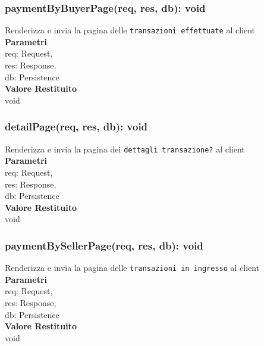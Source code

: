\documentclass[a4paper, 12pt]{article}
\begin{document}
\subsubsection{paymentByBuyerPage(req, res, db): void}
Renderizza e invia la pagina delle \texttt{transazioni effettuate} al client\\
\textbf{Parametri}\\
req: Request,\\
res: Response,\\
db: Persistence\\
\textbf{Valore Restituito}\\
void
\subsubsection{detailPage(req, res, db): void}
Renderizza e invia la pagina dei \texttt{dettagli transazione?} al client\\
\textbf{Parametri}\\
req: Request,\\
res: Response,\\
db: Persistence\\
\textbf{Valore Restituito}\\
void
\subsubsection{paymentBySellerPage(req, res, db): void}
Renderizza e invia la pagina delle \texttt{transazioni in ingresso} al client\\
\textbf{Parametri}\\
req: Request,\\
res: Response,\\
db: Persistence\\
\textbf{Valore Restituito}\\
void
\end{document}
